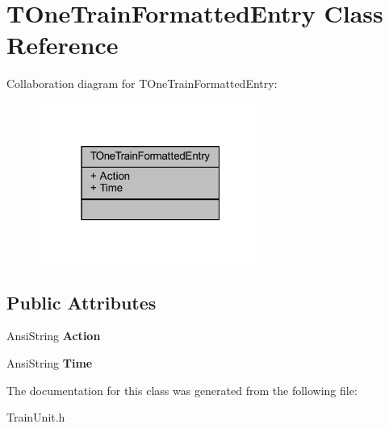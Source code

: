 \hypertarget{class_t_one_train_formatted_entry}{}\section{T\+One\+Train\+Formatted\+Entry Class Reference}
\label{class_t_one_train_formatted_entry}


Collaboration diagram for T\+One\+Train\+Formatted\+Entry\+:\nopagebreak
\begin{figure}[H]
\begin{center}
\leavevmode
\includegraphics[width=208pt]{class_t_one_train_formatted_entry__coll__graph}
\end{center}
\end{figure}
\subsection*{Public Attributes}
\begin{DoxyCompactItemize}
\item 
\mbox{\label{class_t_one_train_formatted_entry_aed96f14cc0862be5da673e206090e6d6}} 
Ansi\+String {\bfseries Action}
\item 
\mbox{\label{class_t_one_train_formatted_entry_a1731ee3ca7f8f0a0e7a5d048737bdeec}} 
Ansi\+String {\bfseries Time}
\end{DoxyCompactItemize}


The documentation for this class was generated from the following file\+:\begin{DoxyCompactItemize}
\item 
Train\+Unit.\+h\end{DoxyCompactItemize}
